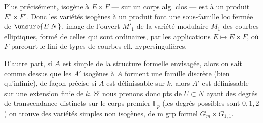 
\margin{de variétés isogènes à $E\times F$ ! ]}

Plus précisément,  isogène à $E\times F$  --- sur un corps alg. clos --- est   à un produit $E'\times F'$. Donc les variétés isogènes à un produit font une sous-famille loc fermée de $\unsure{E|N}$, image de l'ouvert $M'_1$ de la variété modulaire $M_1$ des courbes elliptiques, formé de celles qui sont ordinaires, par les applications $E\mapsto E\times F$, où $F$ parcourt le  fini de types de courbes ell. hypersingulières. 


D'autre part, si $A$ est \uline{simple} de la structure formelle envisagée, alors on sait comme dessus que  les $A'$ isogènes à $A$ forment une famille \uline{discrète} (bien qu'infinie), de façon précise si $A$ est définissable sur $k$, alors $A'$ est définissable sur une extension \uline{finie} de $k$. Si nous prenons donc pts de  $U\subset N$  ayant des degrés de transcendance distincts sur le corps premier $\mathbb F_p$ (les degrés possibles sont $0,1,2$) on trouve des variétés \uline{simples} \uline{non isogènes}, de $\overline{\mathrm m}$ grp formel $\overline G_m\times G_{1,1}$.

